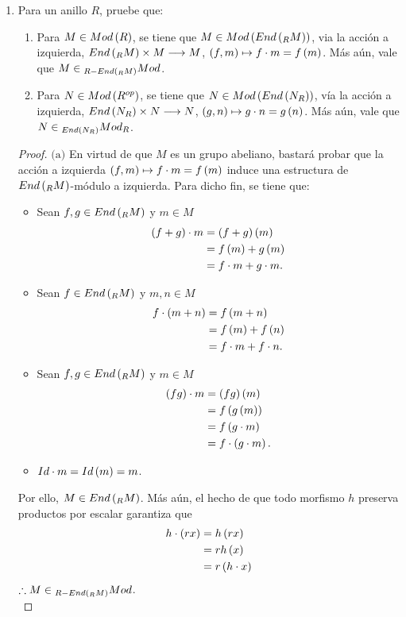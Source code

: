 \documentclass{article}
\begin{document}
\begin{enumerate}[label=\textbf{Ej \arabic*.}]
		\item Para un anillo $R$, pruebe que:
		\begin{enumerate}
			\item Para $M \in Mod\left(R\right)$, se tiene que $M \in Mod\left(End\left(_{R}M\right)\right)$, via la acción a izquierda, $End\left(_{R}M\right) \times M \longrightarrow M$, $\left(f,m\right) \mapsto f \cdot m = f\left(m\right)$. Más aún, vale que $M \in {}_{R-End\left(_{R}M\right)}Mod$.
			\item Para $N \in Mod\left({R}^{op}\right)$, se tiene que $N \in Mod\left(End\left(N_{R}\right)\right)$, vía la acción a izquierda, $End\left(N_{R}\right) \times N \longrightarrow N$, $\left(g,n\right) \mapsto g \cdot n = g\left(n\right)$. Más aún, vale que $N \in {}_{End\left(N_{R}\right)}Mod_{R}$.
		\end{enumerate}
		\begin{proof}
			$\boxed{\text{(a)}}$ En virtud de que $M$ es un grupo abeliano, bastará probar que la acción a izquierda $\left(f,m\right) \mapsto f \cdot m = f\left(m\right)$ induce una estructura de $End\left(_{R}M\right)$-módulo a izquierda. Para dicho fin, se tiene que:
			\begin{itemize}
				\item Sean $f,g \in End\left(_{R}M\right)$ y $m \in M$
				\begin{align*}
					\left(f+g\right) \cdot m&=\left(f+g\right)\left(m\right)\\
					&=f\left(m\right)+g\left(m\right)\\
					&=f \cdot m+g \cdot m.
				\end{align*}
				\item Sean $f \in End\left(_{R}M\right)$ y $m,n \in M$
				\begin{align*}
					f \cdot \left(m+n\right)&=f\left(m+n\right)\\
					&=f\left(m\right)+f\left(n\right)\\
					&=f \cdot m+f \cdot n.
				\end{align*}
				\item Sean $f,g \in End\left(_{R}M\right)$ y $m \in M$
				\begin{align*}
					\left(fg\right) \cdot m&=\left(fg\right)\left(m\right)\\
					&=f\left(g\left(m\right)\right)\\
					&=f\left(g \cdot m\right)\\
					&=f \cdot \left(g \cdot m\right).
				\end{align*}
				\item $Id \cdot m=Id\left(m\right)=m$.
			\end{itemize}
			Por ello, $M \in End\left(_{R}M\right)$. Más aún, el hecho de que todo morfismo $h$ preserva productos por escalar garantiza que
			\begin{align*}
				h \cdot \left(rx\right)&=h\left(rx\right)\\
				&=rh\left(x\right)\\
				&=r\left(h \cdot x\right)
			\end{align*}
			$\therefore M \in {}_{R-End\left(_{R}M\right)}Mod$.\\
			

\end{proof}
\end{enumerate}
\end{document}
